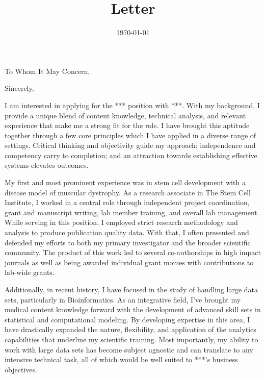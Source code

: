 \documentclass[10pt,letter,sans]{moderncv}
\newcommand{\company}{***}
\newcommand{\role}{***}
\begin{document}

\title{Letter}
\recipient{HR Department}{\company{} \\ ADDRESS \\ CITY, STATE ZIP}
\date{\today}
\opening{To Whom It May Concern,}
\closing{Sincerely,}
\makelettertitle{}

I am interested in applying for the \role{} position with \company{}. With my background, I provide a unique blend of content knowledge, technical analysis, and relevant experience that make me a strong fit for the role. I have brought this aptitude together through a few core principles which I have applied in a diverse range of settings. Critical thinking and objectivity guide my approach; independence and competency carry to completion; and an attraction towards establishing effective systems elevates outcomes.

My first and most prominent experience was in stem cell development with a disease model of muscular dystrophy. As a research associate in The Stem Cell Institute, I worked in a central role through independent project coordination, grant and manuscript writing, lab member training, and overall lab management. While serving in this position, I employed strict research methodology and analysis to produce publication quality data. With that, I often presented and defended my efforts to both my primary investigator and the broader scientific community. The product of this work led to several co-authorships in high impact journals as well as being awarded individual grant monies with contributions to lab-wide grants.

Additionally, in recent history, I have focused in the study of handling large data sets, particularly in Bioinformatics. As an integrative field, I've brought my medical content knowledge forward with the development of advanced skill sets in statistical and computational modeling. By developing expertise in this area, I have drastically expanded the nature, flexibility, and application of the analytics capabilities that underline my scientific training. Most importantly, my ability to work with large data sets has become subject agnostic and can translate to any intensive technical task, all of which would be well suited to \company{}'s business objectives.
\end{document}

